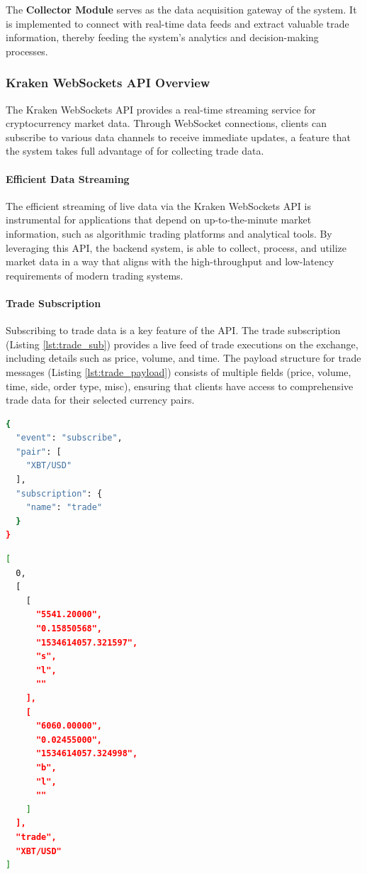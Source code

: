 The \textbf{Collector Module} serves as the data acquisition gateway of the system. It is implemented to connect with real-time data feeds and extract valuable trade information, thereby feeding the system's analytics and decision-making processes.

\subsubsection{Kraken WebSockets API Overview}
The Kraken WebSockets API \cite{KrakenWebsocketsDocumentation} provides a real-time streaming service for cryptocurrency market data. Through WebSocket connections, clients can subscribe to various data channels to receive immediate updates, a feature that the system takes full advantage of for collecting trade data.

\paragraph{Efficient Data Streaming}
The efficient streaming of live data via the Kraken WebSockets API is instrumental for applications that depend on up-to-the-minute market information, such as algorithmic trading platforms and analytical tools. By leveraging this API, the backend system, is able to collect, process, and utilize market data in a way that aligns with the high-throughput and low-latency requirements of modern trading systems.

\paragraph{Trade Subscription}
Subscribing to trade data is a key feature of the API. The trade subscription (Listing \ref{lst:trade_sub}) provides a live feed of trade executions on the exchange, including details such as price, volume, and time. The payload structure for trade messages (Listing \ref{lst:trade_payload}) consists of multiple fields (price, volume, time, side, order type, misc), ensuring that clients have access to comprehensive trade data for their selected currency pairs.


\begin{lstlisting}[language=bash, caption={Subscription for Trade Data}, label={lst:trade_sub}]
{
  "event": "subscribe",
  "pair": [
    "XBT/USD"
  ],
  "subscription": {
    "name": "trade"
  }
}
\end{lstlisting}

\begin{lstlisting}[language=bash, caption={Trade Message Payload}, label={lst:trade_payload}]
[
  0,
  [
    [
      "5541.20000",
      "0.15850568",
      "1534614057.321597",
      "s",
      "l",
      ""
    ],
    [
      "6060.00000",
      "0.02455000",
      "1534614057.324998",
      "b",
      "l",
      ""
    ]
  ],
  "trade",
  "XBT/USD"
]
\end{lstlisting}

